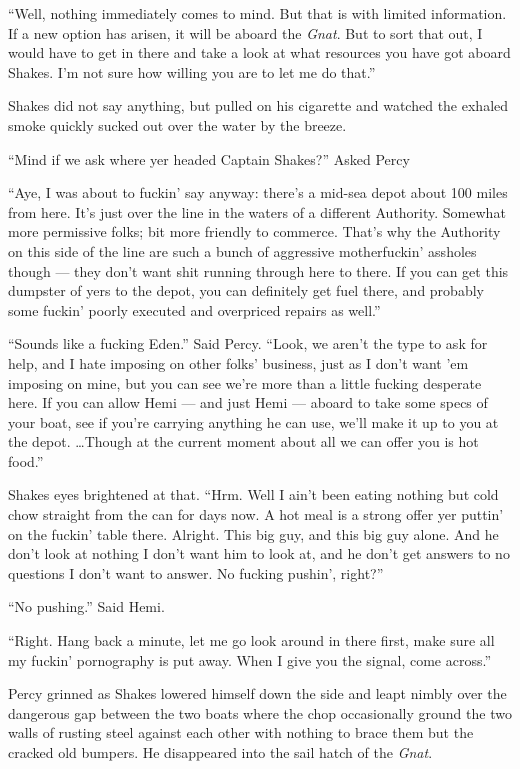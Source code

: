 \documentclass[
]{scrbook}
\begin{document}
``Well, nothing immediately comes to mind. But that is with limited
information. If a new option has arisen, it will be aboard the
\emph{Gnat}. But to sort that out, I would have to get in there and take
a look at what resources you have got aboard Shakes. I'm not sure how
willing you are to let me do that.''

Shakes did not say anything, but pulled on his cigarette and watched the
exhaled smoke quickly sucked out over the water by the breeze.

``Mind if we ask where yer headed Captain Shakes?'' Asked Percy

``Aye, I was about to fuckin' say anyway: there's a mid-sea depot about
100 miles from here. It's just over the line in the waters of a
different Authority. Somewhat more permissive folks; bit more friendly
to commerce. That's why the Authority on this side of the line are such
a bunch of aggressive motherfuckin' assholes though --- they don't want
shit running through here to there. If you can get this dumpster of yers
to the depot, you can definitely get fuel there, and probably some
fuckin' poorly executed and overpriced repairs as well.''

``Sounds like a fucking Eden.'' Said Percy. ``Look, we aren't the type
to ask for help, and I hate imposing on other folks' business, just as I
don't want 'em imposing on mine, but you can see we're more than a
little fucking desperate here. If you can allow Hemi --- and just Hemi
--- aboard to take some specs of your boat, see if you're carrying
anything he can use, we'll make it up to you at the depot. \ldots Though
at the current moment about all we can offer you is hot food.''

Shakes eyes brightened at that. ``Hrm. Well I ain't been eating nothing
but cold chow straight from the can for days now. A hot meal is a strong
offer yer puttin' on the fuckin' table there. Alright. This big guy, and
this big guy alone. And he don't look at nothing I don't want him to
look at, and he don't get answers to no questions I don't want to
answer. No fucking pushin', right?''

``No pushing.'' Said Hemi.

``Right. Hang back a minute, let me go look around in there first, make
sure all my fuckin' pornography is put away. When I give you the signal,
come across.''

Percy grinned as Shakes lowered himself down the side and leapt nimbly
over the dangerous gap between the two boats where the chop occasionally
ground the two walls of rusting steel against each other with nothing to
brace them but the cracked old bumpers. He disappeared into the sail
hatch of the \emph{Gnat}.
\end{document}
